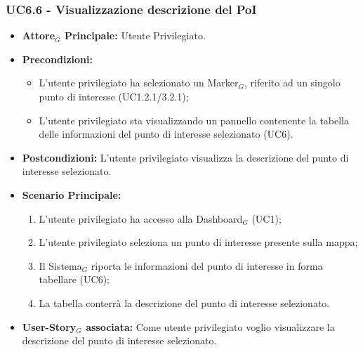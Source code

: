 \documentclass[10pt]{article}
\begin{document}
\begin{justify}
 \subsubsection{\textbf{UC6.6 - Visualizzazione descrizione del PoI}}
 \begin{itemize}
     \item \textbf{Attore$_G$ Principale:} Utente Privilegiato.
     \item \textbf{Precondizioni:}
       \begin{itemize}
    	        \item L'utente privilegiato ha selezionato un Marker$_G$, riferito ad un singolo punto di interesse (UC1.2.1/3.2.1);
          \item L'utente privilegiato sta visualizzando un pannello contenente la tabella delle informazioni del punto di interesse selezionato (UC6).
       \end{itemize}
     \item \textbf{Postcondizioni:} L'utente privilegiato visualizza la descrizione del punto di interesse selezionato.
     \item \textbf{Scenario Principale:}
        \begin{enumerate}
            \item L'utente privilegiato ha accesso alla Dashboard$_G$ (UC1);
            \item L'utente privilegiato seleziona un punto di interesse presente sulla mappa;
            \item Il Sistema$_G$ riporta le informazioni del punto di interesse in forma tabellare (UC6);
            \item La tabella conterrà la descrizione del punto di interesse selezionato.
        \end{enumerate}
     \item \textbf{User-Story$_G$ associata:} Come utente privilegiato voglio visualizzare la descrizione del punto di interesse selezionato. 
 \end{itemize}



\end{justify}
\end{document}
